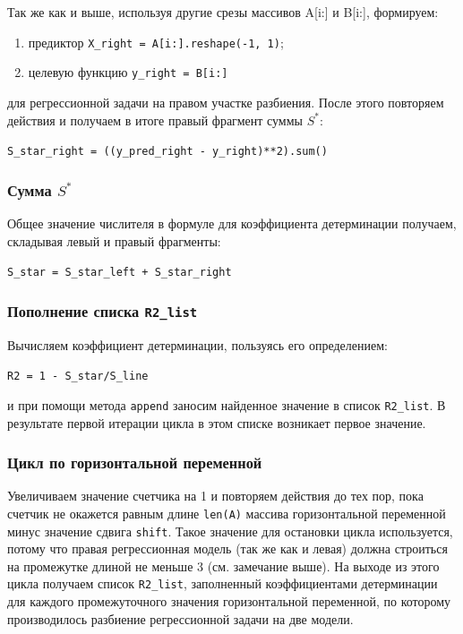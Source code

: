 \documentclass[a4paper,12pt]{article}
\begin{document}
Так же как и выше, используя другие срезы массивов A[i:] и B[i:], формируем: 

\medskip\noindent

\begin{enumerate}
	\item предиктор \texttt{X\_right = A[i:].reshape(-1, 1)};
	\item целевую функцию \texttt{y\_right = B[i:]}
\end{enumerate}


\medskip\noindent
для регрессионной задачи на правом участке разбиения. После этого повторяем действия  и получаем в итоге правый фрагмент суммы $S^*$:

\medskip\noindent
\texttt{S\_star\_right = ((y\_pred\_right - y\_right)**2).sum()}


\subsubsection{Сумма $S^*$}

Общее значение числителя в формуле для коэффициента детерминации получаем, складывая левый и правый фрагменты:

\medskip\noindent
\texttt{S\_star = S\_star\_left + S\_star\_right}

\subsubsection{Пополнение списка \texttt{R2\_list}}

Вычисляем коэффициент детерминации, пользуясь его определением:

\medskip\noindent
\texttt{R2 = 1 - S\_star/S\_line}

\medskip\noindent
и при помощи метода \texttt{append} заносим найденное значение в список \texttt{R2\_list}. В результате первой итерации цикла в этом списке возникает первое значение.

\subsubsection{Цикл по горизонтальной переменной} 

Увеличиваем значение счетчика на 1 и повторяем действия до тех пор, пока счетчик не окажется равным длине \texttt{len(A)} массива горизонтальной переменной минус значение сдвига \texttt{shift}. Такое значение для остановки цикла используется, потому что правая регрессионная модель (так же как и левая) должна строиться на промежутке длиной не меньше 3 (см. замечание выше). На выходе из этого цикла получаем список \texttt{R2\_list}, заполненный коэффициентами детерминации для каждого промежуточного значения горизонтальной переменной, по которому производилось разбиение регрессионной задачи на две модели.
\end{document}
